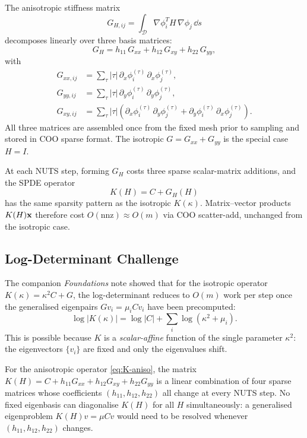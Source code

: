 \documentclass[11pt]{article}
\begin{document}
The anisotropic stiffness matrix
\[
G_{H,ij} = \int_\mathcal{D} \nabla\phi_i^T H\,\nabla\phi_j\,\dd s
\]
decomposes linearly over three basis matrices:
\begin{equation}
  G_H = h_{11}\,G_{xx} + h_{12}\,G_{xy} + h_{22}\,G_{yy},
  \label{eq:GH-decomp}
\end{equation}
with
\begin{align}
  G_{xx,ij} &= \sum_\tau |\tau|\,
    \partial_x\phi_i^{(\tau)}\,\partial_x\phi_j^{(\tau)}, \\
  G_{yy,ij} &= \sum_\tau |\tau|\,
    \partial_y\phi_i^{(\tau)}\,\partial_y\phi_j^{(\tau)}, \\
  G_{xy,ij} &= \sum_\tau |\tau|\!\left(
    \partial_x\phi_i^{(\tau)}\,\partial_y\phi_j^{(\tau)}
    + \partial_y\phi_i^{(\tau)}\,\partial_x\phi_j^{(\tau)}\right).
\end{align}
All three matrices are assembled once from the fixed mesh prior to sampling and
stored in COO sparse format.  The isotropic $G = G_{xx} + G_{yy}$ is the
special case $H = I$.

At each NUTS step, forming $G_H$ costs three sparse scalar-matrix additions, and
the SPDE operator
\begin{equation}
  K(H) = C + G_H(H)
  \label{eq:K-aniso}
\end{equation}
has the same sparsity pattern as the isotropic $K(\kappa)$.  Matrix--vector
products $K(H)\mathbf{x}$ therefore cost $O(\mathrm{nnz}) \approx O(m)$ via COO
scatter-add, unchanged from the isotropic case.

\subsection{Log-Determinant Challenge}
\label{sec:logdet-aniso}

The companion \emph{Foundations} note showed that for the isotropic operator
$K(\kappa) = \kappa^2 C + G$, the log-determinant reduces to $O(m)$ work per step
once the generalised eigenpairs $G v_i = \mu_i C v_i$ have been precomputed:
\[
  \log|K(\kappa)| = \log|C| + \textstyle\sum_i \log(\kappa^2 + \mu_i).
\]
This is possible because $K$ is a \emph{scalar-affine} function of the single
parameter $\kappa^2$: the eigenvectors $\{v_i\}$ are fixed and only the
eigenvalues shift.

For the anisotropic operator \eqref{eq:K-aniso}, the matrix
$K(H) = C + h_{11}G_{xx} + h_{12}G_{xy} + h_{22}G_{yy}$
is a linear combination of four sparse matrices whose coefficients
$(h_{11}, h_{12}, h_{22})$ all change at every NUTS step.  No fixed eigenbasis
can diagonalise $K(H)$ for all $H$ simultaneously: a generalised eigenproblem
$K(H) v = \mu C v$ would need to be resolved whenever $(h_{11}, h_{12}, h_{22})$
changes.
\end{document}

